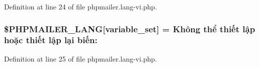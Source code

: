 Definition at line 24 of file phpmailer.\+lang-\/vi.\+php.

\subsubsection[{\texorpdfstring{\$\+P\+H\+P\+M\+A\+I\+L\+E\+R\+\_\+\+L\+A\+NG}{$PHPMAILER_LANG}}]{\setlength{\rightskip}{0pt plus 5cm}\$P\+H\+P\+M\+A\+I\+L\+E\+R\+\_\+\+L\+A\+NG\mbox{[}\textquotesingle{}variable\+\_\+set\textquotesingle{}\mbox{]} = \textquotesingle{}Không thể thiết lập hoặc thiết lập lại biến\+: \textquotesingle{}}\hypertarget{phpmailer_8lang-vi_8php_af795debc7a739d038742691c358d9032}{}\label{phpmailer_8lang-vi_8php_af795debc7a739d038742691c358d9032}


Definition at line 25 of file phpmailer.\+lang-\/vi.\+php.

